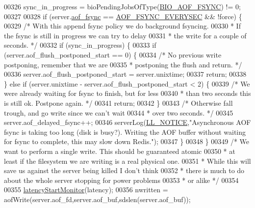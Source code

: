 \begin{DoxyCode}
{{{00326         sync\_in\_progress = bioPendingJobsOfType(\hyperlink{bio_8h_a5d03c967316addafc61b7ed5d957984f}{BIO\_AOF\_FSYNC}) != 0;
00327 
00328     \textcolor{keywordflow}{if} (server.\hyperlink{config_8h_af5994c643c434574580bb7816af82cad}{aof\_fsync} == \hyperlink{server_8h_a9784233b87ec796d0343556106fb778e}{AOF\_FSYNC\_EVERYSEC} && !force) \{
00329         \textcolor{comment}{/* With this append fsync policy we do background fsyncing.}
00330 \textcolor{comment}{         * If the fsync is still in progress we can try to delay}
00331 \textcolor{comment}{         * the write for a couple of seconds. */}
00332         \textcolor{keywordflow}{if} (sync\_in\_progress) \{
00333             \textcolor{keywordflow}{if} (server.aof\_flush\_postponed\_start == 0) \{
00334                 \textcolor{comment}{/* No previous write postponing, remember that we are}
00335 \textcolor{comment}{                 * postponing the flush and return. */}
00336                 server.aof\_flush\_postponed\_start = server.unixtime;
00337                 \textcolor{keywordflow}{return};
00338             \} \textcolor{keywordflow}{else} \textcolor{keywordflow}{if} (server.unixtime - server.aof\_flush\_postponed\_start < 2) \{
00339                 \textcolor{comment}{/* We were already waiting for fsync to finish, but for less}
00340 \textcolor{comment}{                 * than two seconds this is still ok. Postpone again. */}
00341                 \textcolor{keywordflow}{return};
00342             \}
00343             \textcolor{comment}{/* Otherwise fall trough, and go write since we can't wait}
00344 \textcolor{comment}{             * over two seconds. */}
00345             server.aof\_delayed\_fsync++;
00346             serverLog(\hyperlink{server_8h_a8c54c191e436c7dd3012167212692401}{LL\_NOTICE},\textcolor{stringliteral}{"Asynchronous AOF fsync is taking too long (disk is busy?).
       Writing the AOF buffer without waiting for fsync to complete, this may slow down Redis."});
00347         \}
00348     \}
00349     \textcolor{comment}{/* We want to perform a single write. This should be guaranteed atomic}
00350 \textcolor{comment}{     * at least if the filesystem we are writing is a real physical one.}
00351 \textcolor{comment}{     * While this will save us against the server being killed I don't think}
00352 \textcolor{comment}{     * there is much to do about the whole server stopping for power problems}
00353 \textcolor{comment}{     * or alike */}
00354 
00355     \hyperlink{latency_8h_a87d7b5b368dad97457f13466d760b0e1}{latencyStartMonitor}(latency);
00356     nwritten = aofWrite(server.aof\_fd,server.aof\_buf,sdslen(server.aof\_buf));
}}}
\end{DoxyCode}
